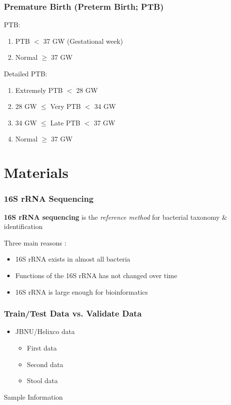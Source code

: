 \documentclass{beamer}
\begin{document}
    \begin{frame}
        \frametitle{Premature Birth (Preterm Birth; PTB)}

        PTB:
        \begin{enumerate}
            \item PTB $<$ 37 GW (Gestational week)
            \item Normal $\ge$ 37 GW
        \end{enumerate}

        Detailed PTB:
        \begin{enumerate}
            \item Extremely PTB $<$ 28 GW
            \item 28 GW $\le$ Very PTB $<$ 34 GW
            \item 34 GW $\le$ Late PTB $<$ 37 GW
            \item Normal $\ge$ 37 GW
        \end{enumerate}

        \cite{premature1, premature2}
    \end{frame}

    \section{Materials}
    \begin{frame}
        \frametitle{16S rRNA Sequencing}

        \textbf{16S rRNA sequencing} is the \textit{reference method} for bacterial taxonomy \& identification \cite{16S1}

        Three main reasons \cite{16S2}:
        \begin{itemize}
            \item 16S rRNA exists in almost all bacteria
            \item Functions of the 16S rRNA has not changed over time
            \item 16S rRNA is large enough for bioinformatics
        \end{itemize}
    \end{frame}

    \begin{frame}
        \frametitle{Train/Test Data vs. Validate Data}
        \begin{itemize}
            \item JBNU/Helixco data
            \begin{itemize}
                \item First data
                \item Second data
                \item Stool data
            \end{itemize}
        \end{itemize}

        \begin{table}
            \centering
            \caption{Sample Information}
            
        \end{table}
    \end{frame}
\end{document}
